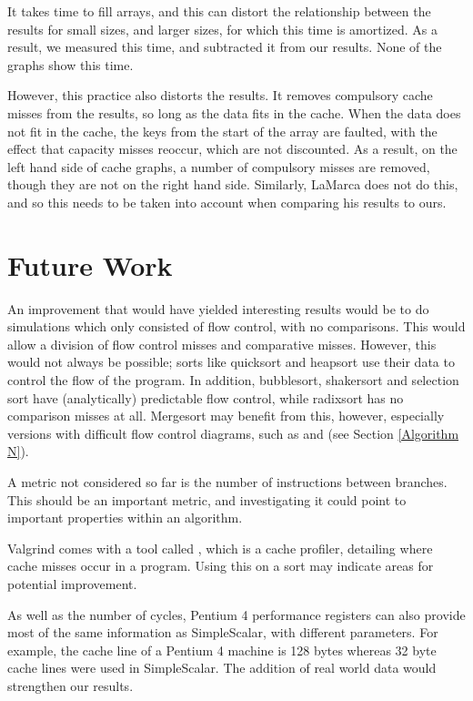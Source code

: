 It takes time to fill arrays, and this can distort the relationship between the
results for small sizes, and larger sizes, for which this time is amortized. As
a result, we measured this time, and subtracted it from our results. None of the
graphs show this time. 

However, this practice also distorts the results. It removes compulsory cache
misses from the results, so long as the data fits in the cache. When the data
does not fit in the cache, the keys from the start of the array are faulted,
with the effect that capacity misses reoccur, which are not discounted. As a
result, on the left hand side of cache graphs, a number of compulsory misses are
removed, though they are not on the right hand side. Similarly, LaMarca does not
do this, and so this needs to be taken into account when comparing his results
to ours.


\section{Future Work}
An improvement that would have yielded interesting results would be to do simulations
which only consisted of flow control, with no comparisons. This would allow a
division of flow control misses and comparative misses. However, this would not
always be possible; sorts like quicksort and heapsort use their data to
control the flow of the program. In addition, bubblesort, shakersort and
selection sort have (analytically) predictable flow control, while radixsort has
no comparison misses at all. Mergesort may benefit from this, however, especially versions
with difficult flow control diagrams, such as  and  (see Section \ref{Algorithm N}).

A metric not considered so far is the number of instructions between branches.
This should be an important metric, and investigating it could point to
important properties within an algorithm.

Valgrind comes with a tool called , which is a cache
profiler, detailing where cache misses occur in a program. Using this on a
sort may indicate areas for potential improvement.

As well as the number of cycles, Pentium 4 performance registers can also provide
most of the same information as SimpleScalar, with different parameters. For
example, the cache line of a Pentium 4 machine is 128 bytes whereas 32 byte
cache lines were used in SimpleScalar. The addition of real world data would
strengthen our results.
